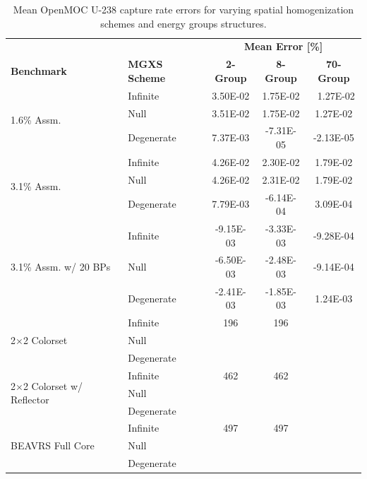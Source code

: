 \begin{table}[h!]
  \centering
  \caption[Mean OpenMOC U-238 capture rate errors]{Mean OpenMOC U-238 capture rate errors for varying spatial homogenization schemes and energy groups structures.}
  \small
  \label{table:chap8-openmoc-mean-capt-rates}
  \vspace{6pt}
  \begin{tabular}{l l c c c}
  \toprule
  \rowcolor{lightgray}
  & & \multicolumn{3}{c}{\cellcolor{lightgray} \textbf{Mean Error [\%]}} \\
  \multirow{-2}{*}{\cellcolor{lightgray} \bf Benchmark} &
  \multirow{-2}{*}{\cellcolor{lightgray} \bf \ac{MGXS} Scheme} &
  {\cellcolor{lightgray} \bf 2-Group} &
  {\cellcolor{lightgray} \bf 8-Group} &
  {\cellcolor{lightgray} \bf 70-Group} \\
  \midrule
\multirow{3}{*}{\parbox{2.5cm}{1.6\% Assm.}} & Infinite & 3.50E-02 & 1.75E-02 &\
 1.27E-02 \\
& Null & 3.51E-02 & 1.75E-02 & 1.27E-02 \\
& Degenerate & 7.37E-03 & -7.31E-05 & -2.13E-05 \\
  \midrule
  \multirow{3}{*}{\parbox{2.5cm}{3.1\% Assm.}} & Infinite & 4.26E-02 & 2.30E-02 & 1.79E-02 \\
& Null & 4.26E-02 & 2.31E-02 & 1.79E-02 \\
& Degenerate & 7.79E-03 & -6.14E-04 & 3.09E-04 \\
  \midrule
  \multirow{3}{*}{\parbox{2cm}{3.1\% Assm. w/ 20 BPs}} & Infinite & -9.15E-03 & -3.33E-03 & -9.28E-04 \\
& Null & -6.50E-03 & -2.48E-03 & -9.14E-04 \\
& Degenerate & -2.41E-03 & -1.85E-03 & 1.24E-03 \\
  \midrule
  \multirow{3}{*}{\parbox{2.5cm}{2$\times$2 Colorset}} & Infinite & 196 & 196 & \\
  & Null & & & \\
  & Degenerate & & & \\
  \midrule
  \multirow{3}{*}{\parbox{2.3cm}{2$\times$2 Colorset w/ Reflector}} & Infinite & 462 & 462 & \\
  & Null & & & \\
  & Degenerate & & & \\
  \midrule
  \multirow{3}{*}{\parbox{2cm}{\ac{BEAVRS} Full Core}} & Infinite & 497 & 497 & \\
  & Null & & & \\
  & Degenerate & & & \\
  \bottomrule
\end{tabular}
\end{table}



